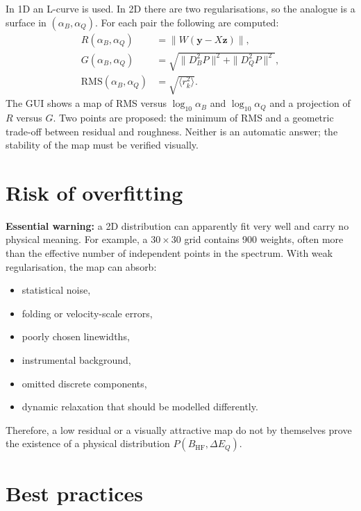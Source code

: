 \documentclass[11pt,a4paper]{article}
\newcommand{\BHF}{B_{\mathrm{HF}}}
\newcommand{\DEQ}{\Delta E_Q}
\begin{document}
In 1D an L-curve is used. In 2D there are two regularisations, so the analogue
is a surface in $(\alpha_B,\alpha_Q)$. For each pair the following are computed:
\begin{align}
  R(\alpha_B,\alpha_Q)&=\|W(\bm y-X\bm z)\|,\\
  G(\alpha_B,\alpha_Q)&=\sqrt{\|D_B^2P\|^2+\|D_Q^2P\|^2},\\
  \mathrm{RMS}(\alpha_B,\alpha_Q)&=\sqrt{\langle r_k^2\rangle}.
\end{align}
The GUI shows a map of RMS versus $\log_{10}\alpha_B$ and $\log_{10}\alpha_Q$
and a projection of $R$ versus $G$. Two points are proposed: the minimum of
RMS and a geometric trade-off between residual and roughness. Neither is an
automatic answer; the stability of the map must be verified visually.

\section{Risk of overfitting}

\textbf{Essential warning:} a 2D distribution can apparently fit very well
and carry no physical meaning. For example, a $30\times30$ grid contains 900
weights, often more than the effective number of independent points in the
spectrum. With weak regularisation, the map can absorb:
\begin{itemize}
  \item statistical noise,
  \item folding or velocity-scale errors,
  \item poorly chosen linewidths,
  \item instrumental background,
  \item omitted discrete components,
  \item dynamic relaxation that should be modelled differently.
\end{itemize}
Therefore, a low residual or a visually attractive map do not by themselves
prove the existence of a physical distribution $P(\BHF,\DEQ)$.

\section{Best practices}
\end{document}
